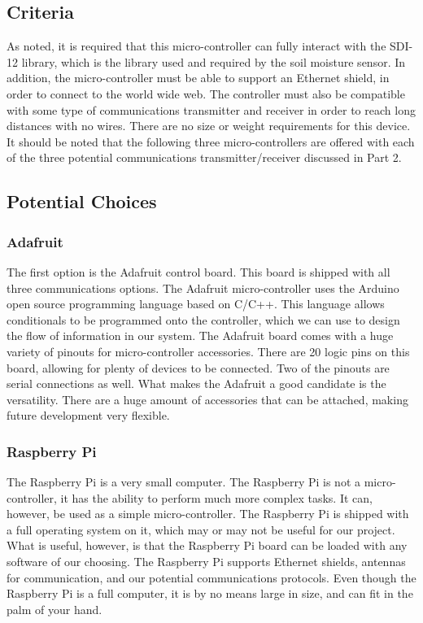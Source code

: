 \documentclass[onecolumn, draftclsnofoot,10pt, compsoc]{IEEEtran}
\begin{document}
    \subsection{Criteria}
    As noted, it is required that this micro-controller can fully interact with the SDI-12 library, which is the library used and required by the soil moisture sensor.
    In addition, the micro-controller must be able to support an Ethernet shield, in order to connect to the world wide web. 
    The controller must also be compatible with some type of communications transmitter and receiver in order to reach long distances with no wires. 
    There are no size or weight requirements for this device. 
    It should be noted that the following three micro-controllers are offered with each of the three potential communications transmitter/receiver discussed in Part 2. 
    
    
    
    \subsection{Potential Choices}
    \subsubsection{Adafruit}
    The first option is the Adafruit control board.
    This board is shipped with all three communications options. 
    The Adafruit micro-controller uses the Arduino open source programming language based on C/C++. 
    This language allows conditionals to be programmed onto the controller, which we can use to design the flow of information in our system.
    The Adafruit board comes with a huge variety of pinouts for micro-controller accessories. 
    There are 20 logic pins on this board, allowing for plenty of devices to be connected. 
    Two of the pinouts are serial connections as well.
    What makes the Adafruit a good candidate is the versatility. 
    There are a huge amount of accessories that can be attached, making future development very flexible.
    
    \subsubsection{Raspberry Pi}
    The Raspberry Pi is a very small computer. 
    The Raspberry Pi is not a micro-controller, it has the ability to perform much more complex tasks.
    It can, however, be used as a simple micro-controller.
    The Raspberry Pi is shipped with a full operating system on it, which may or may not be useful for our project. 
    What is useful, however, is that the Raspberry Pi board can be loaded with any software of our choosing.
    The Raspberry Pi supports Ethernet shields, antennas for communication, and our potential communications protocols.
    Even though the Raspberry Pi is a full computer, it is by no means large in size, and can fit in the palm of your hand.
    
\end{document}
